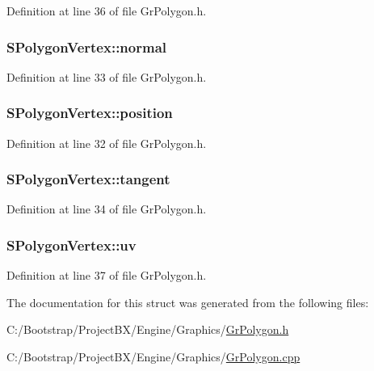 Definition at line 36 of file GrPolygon.h.\hypertarget{struct_s_polygon_vertex_107117b51a3b3ca1863396cf8333ca1d}{
\subsubsection[{normal}]{ {\bf SPolygonVertex::normal}}}
\label{struct_s_polygon_vertex_107117b51a3b3ca1863396cf8333ca1d}




Definition at line 33 of file GrPolygon.h.\hypertarget{struct_s_polygon_vertex_522e1e97ae3be47d4ea6d424773fc569}{
\subsubsection[{position}]{ {\bf SPolygonVertex::position}}}
\label{struct_s_polygon_vertex_522e1e97ae3be47d4ea6d424773fc569}




Definition at line 32 of file GrPolygon.h.\hypertarget{struct_s_polygon_vertex_3ef855ac9b84b59cbbed657520d9c7fd}{
\subsubsection[{tangent}]{ {\bf SPolygonVertex::tangent}}}
\label{struct_s_polygon_vertex_3ef855ac9b84b59cbbed657520d9c7fd}




Definition at line 34 of file GrPolygon.h.\hypertarget{struct_s_polygon_vertex_022e87802986b84acbdae9c27e689c12}{
\subsubsection[{uv}]{ {\bf SPolygonVertex::uv}}}
\label{struct_s_polygon_vertex_022e87802986b84acbdae9c27e689c12}




Definition at line 37 of file GrPolygon.h.

The documentation for this struct was generated from the following files:\begin{CompactItemize}
\item 
C:/Bootstrap/ProjectBX/Engine/Graphics/\hyperlink{_gr_polygon_8h}{GrPolygon.h}\item 
C:/Bootstrap/ProjectBX/Engine/Graphics/\hyperlink{_gr_polygon_8cpp}{GrPolygon.cpp}\end{CompactItemize}
